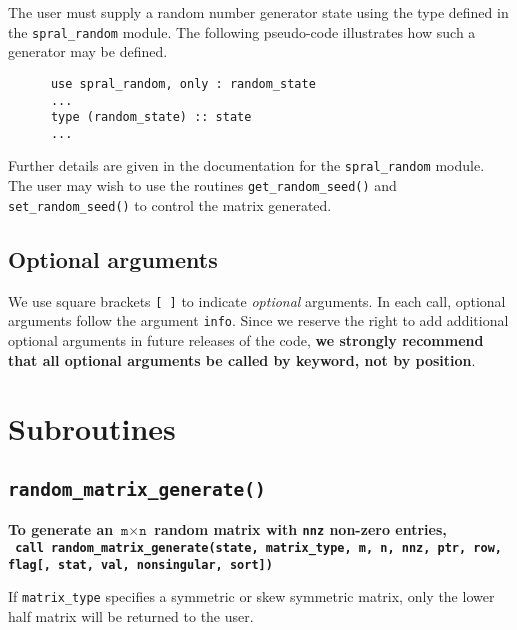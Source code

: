 The user must supply a random number generator state using the type
defined in the \texttt{spral\_random} module. 
The following pseudo-code illustrates how such a generator may be defined.
\begin{verbatim}
      use spral_random, only : random_state
      ...
      type (random_state) :: state
      ...
\end{verbatim}
Further details are given in the documentation for the \texttt{spral\_random}
module. The user may wish to use the routines \texttt{get\_random\_seed()} and
\texttt{set\_random\_seed()} to control the matrix generated.

\subsection{Optional arguments}\label{Optional arguments}

We use square brackets {\tt [ ]} to indicate {\it optional} arguments.
In each
call, optional arguments follow the argument {\tt info}.  Since we
reserve the right to add additional optional arguments in future
releases of the code, {\bf we strongly recommend that all optional
arguments be called by keyword, not by position}.


\section{Subroutines}

\subsection{\texttt{random\_matrix\_generate()}}
\textbf{
   To generate an $\texttt{m}\times \texttt{n}$ random matrix with \texttt{nnz}
   non-zero entries,
   \vspace*{0.1cm} \\
   \texttt{ \hspace*{0.2cm}
      call random\_matrix\_generate(state, matrix\_type, m, n, nnz, ptr, row, flag[, stat, val, nonsingular, sort])
   }
}

\noindent
If \texttt{matrix\_type} specifies a
symmetric or skew symmetric matrix, only the lower half matrix will be returned
to the user.

